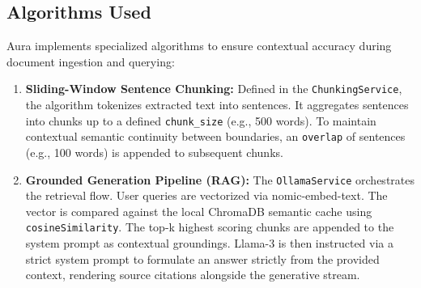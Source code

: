 \subsection{Algorithms Used}
Aura implements specialized algorithms to ensure contextual accuracy during document ingestion and querying:
\begin{enumerate}
    \item \textbf{Sliding-Window Sentence Chunking:} Defined in the \texttt{ChunkingService}, the algorithm tokenizes extracted text into sentences. It aggregates sentences into chunks up to a defined \texttt{chunk\_size} (e.g., 500 words). To maintain contextual semantic continuity between boundaries, an \texttt{overlap} of sentences (e.g., 100 words) is appended to subsequent chunks.
    \item \textbf{Grounded Generation Pipeline (RAG):} The \texttt{OllamaService} orchestrates the retrieval flow. User queries are vectorized via nomic-embed-text. The vector is compared against the local ChromaDB semantic cache using \texttt{cosineSimilarity}. The top-k highest scoring chunks are appended to the system prompt as contextual groundings. Llama-3 is then instructed via a strict system prompt to formulate an answer strictly from the provided context, rendering source citations alongside the generative stream.
\end{enumerate}
